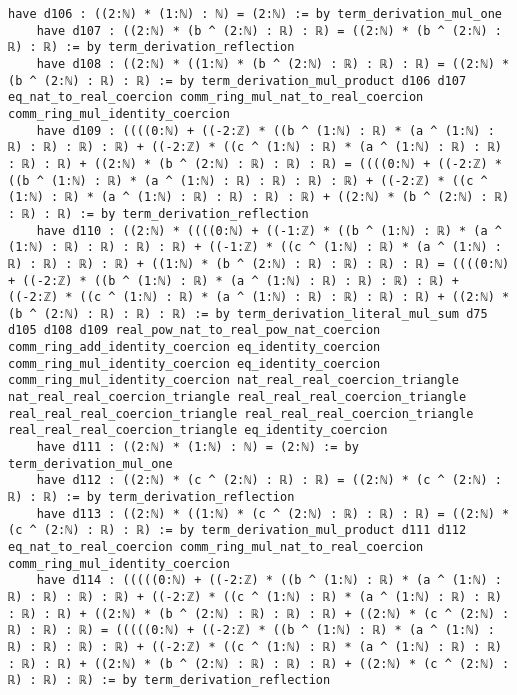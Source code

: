 \documentclass{article}
\begin{document}
\begin{tcolorbox}[colback=white!10, width=\linewidth]
\begin{lstlisting}[language=Lean4]
    have d106 : ((2:ℕ) * (1:ℕ) : ℕ) = (2:ℕ) := by term_derivation_mul_one
    have d107 : ((2:ℕ) * (b ^ (2:ℕ) : ℝ) : ℝ) = ((2:ℕ) * (b ^ (2:ℕ) : ℝ) : ℝ) := by term_derivation_reflection
    have d108 : ((2:ℕ) * ((1:ℕ) * (b ^ (2:ℕ) : ℝ) : ℝ) : ℝ) = ((2:ℕ) * (b ^ (2:ℕ) : ℝ) : ℝ) := by term_derivation_mul_product d106 d107 eq_nat_to_real_coercion comm_ring_mul_nat_to_real_coercion comm_ring_mul_identity_coercion
    have d109 : ((((0:ℕ) + ((-2:ℤ) * ((b ^ (1:ℕ) : ℝ) * (a ^ (1:ℕ) : ℝ) : ℝ) : ℝ) : ℝ) + ((-2:ℤ) * ((c ^ (1:ℕ) : ℝ) * (a ^ (1:ℕ) : ℝ) : ℝ) : ℝ) : ℝ) + ((2:ℕ) * (b ^ (2:ℕ) : ℝ) : ℝ) : ℝ) = ((((0:ℕ) + ((-2:ℤ) * ((b ^ (1:ℕ) : ℝ) * (a ^ (1:ℕ) : ℝ) : ℝ) : ℝ) : ℝ) + ((-2:ℤ) * ((c ^ (1:ℕ) : ℝ) * (a ^ (1:ℕ) : ℝ) : ℝ) : ℝ) : ℝ) + ((2:ℕ) * (b ^ (2:ℕ) : ℝ) : ℝ) : ℝ) := by term_derivation_reflection
    have d110 : ((2:ℕ) * ((((0:ℕ) + ((-1:ℤ) * ((b ^ (1:ℕ) : ℝ) * (a ^ (1:ℕ) : ℝ) : ℝ) : ℝ) : ℝ) + ((-1:ℤ) * ((c ^ (1:ℕ) : ℝ) * (a ^ (1:ℕ) : ℝ) : ℝ) : ℝ) : ℝ) + ((1:ℕ) * (b ^ (2:ℕ) : ℝ) : ℝ) : ℝ) : ℝ) = ((((0:ℕ) + ((-2:ℤ) * ((b ^ (1:ℕ) : ℝ) * (a ^ (1:ℕ) : ℝ) : ℝ) : ℝ) : ℝ) + ((-2:ℤ) * ((c ^ (1:ℕ) : ℝ) * (a ^ (1:ℕ) : ℝ) : ℝ) : ℝ) : ℝ) + ((2:ℕ) * (b ^ (2:ℕ) : ℝ) : ℝ) : ℝ) := by term_derivation_literal_mul_sum d75 d105 d108 d109 real_pow_nat_to_real_pow_nat_coercion comm_ring_add_identity_coercion eq_identity_coercion comm_ring_mul_identity_coercion eq_identity_coercion comm_ring_mul_identity_coercion nat_real_real_coercion_triangle nat_real_real_coercion_triangle real_real_real_coercion_triangle real_real_real_coercion_triangle real_real_real_coercion_triangle real_real_real_coercion_triangle eq_identity_coercion
    have d111 : ((2:ℕ) * (1:ℕ) : ℕ) = (2:ℕ) := by term_derivation_mul_one
    have d112 : ((2:ℕ) * (c ^ (2:ℕ) : ℝ) : ℝ) = ((2:ℕ) * (c ^ (2:ℕ) : ℝ) : ℝ) := by term_derivation_reflection
    have d113 : ((2:ℕ) * ((1:ℕ) * (c ^ (2:ℕ) : ℝ) : ℝ) : ℝ) = ((2:ℕ) * (c ^ (2:ℕ) : ℝ) : ℝ) := by term_derivation_mul_product d111 d112 eq_nat_to_real_coercion comm_ring_mul_nat_to_real_coercion comm_ring_mul_identity_coercion
    have d114 : (((((0:ℕ) + ((-2:ℤ) * ((b ^ (1:ℕ) : ℝ) * (a ^ (1:ℕ) : ℝ) : ℝ) : ℝ) : ℝ) + ((-2:ℤ) * ((c ^ (1:ℕ) : ℝ) * (a ^ (1:ℕ) : ℝ) : ℝ) : ℝ) : ℝ) + ((2:ℕ) * (b ^ (2:ℕ) : ℝ) : ℝ) : ℝ) + ((2:ℕ) * (c ^ (2:ℕ) : ℝ) : ℝ) : ℝ) = (((((0:ℕ) + ((-2:ℤ) * ((b ^ (1:ℕ) : ℝ) * (a ^ (1:ℕ) : ℝ) : ℝ) : ℝ) : ℝ) + ((-2:ℤ) * ((c ^ (1:ℕ) : ℝ) * (a ^ (1:ℕ) : ℝ) : ℝ) : ℝ) : ℝ) + ((2:ℕ) * (b ^ (2:ℕ) : ℝ) : ℝ) : ℝ) + ((2:ℕ) * (c ^ (2:ℕ) : ℝ) : ℝ) : ℝ) := by term_derivation_reflection

\end{lstlisting}
\end{tcolorbox}
\end{document}
